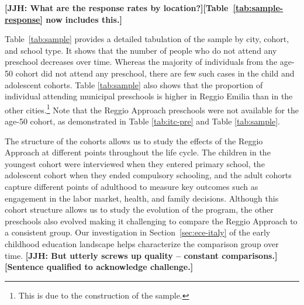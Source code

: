 \textbf{[JJH: What are the response rates by location?]}\textbf{[Table~\ref{tab:sample-response} now includes this.]}

Table~\ref{tab:sample} provides a detailed tabulation of the sample by city, cohort, and school type. It shows that the number of people who do not attend any preschool decreases over time. Whereas the majority of individuals from the age-50 cohort did not attend any preschool, there are few such cases in the child and adolescent cohorts. Table \ref{tab:sample} also shows that the proportion of individual attending municipal preschools is higher in Reggio Emilia than in the other cities.\footnote{This is due to the construction of the sample.} Note that the Reggio Approach preschools were not available for the age-50 cohort, as demonstrated in Table \ref{tab:itc-pre} and Table \ref{tab:sample}.

\begin{table}[H]
\centering
{}
\end{table}

The structure of the cohorts allows us to study the effects of the Reggio Approach at different points throughout the life cycle. The children in the youngest cohort were interviewed when they entered primary school, the adolescent cohort when they ended compulsory schooling, and the adult cohorts capture different points of adulthood to measure key outcomes such as engagement in the labor market, health, and family decisions. Although this cohort structure allows us to study the evolution of the program, the other preschools also evolved making it challenging to compare the Reggio Approach to a consistent group. Our investigation in Section~\ref{sec:ece-italy} of the early childhood education landscape helps characterize the comparison group over time. \textbf{[JJH: But utterly screws up quality -- constant comparisons.]}\textbf{[Sentence qualified to acknowledge challenge.]}

